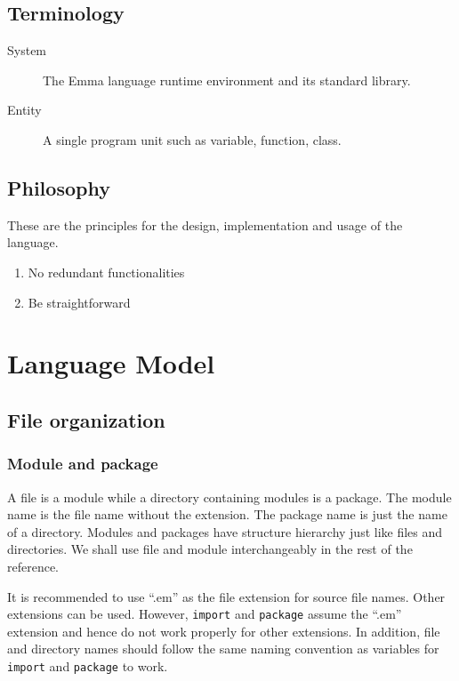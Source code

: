 \documentclass[10pt,a4paper]{article}
\begin{document}
\subsection{Terminology}
\begin{description}
\item[System] The Emma language runtime environment and its standard library.
\item[Entity] A single program unit such as variable, function, class.
\end{description}

\subsection{Philosophy}
These are the principles for the design, implementation and usage of the language.
\begin{enumerate}
\item No redundant functionalities
\item Be straightforward
\end{enumerate}

\pagebreak

\section{Language Model}

\subsection{File organization}

\subsubsection{Module and package}
A file is a module while a directory containing modules is a package. 
The module name is the file name without the extension.
The package name is just the name of a directory.
Modules and packages have structure hierarchy just like
files and directories. 
We shall use file and module interchangeably in the rest of the reference.

It is recommended to use ``.em'' as the file extension for source file names.
Other extensions can be used. However, \lstinline$import$ and 
\lstinline$package$ assume the ``.em'' extension and hence 
do not work properly for other extensions.
In addition, file and directory names should follow the same naming convention
as variables for \lstinline$import$ and \lstinline$package$ to work.
\end{document}
